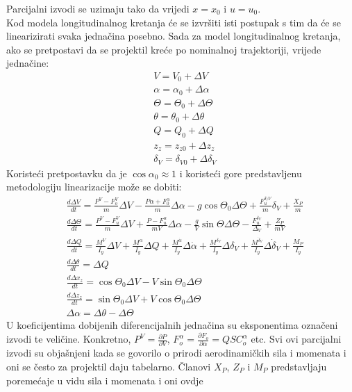 Parcijalni izvodi se uzimaju tako da vrijedi $x=x_0$ i $u=u_0$.\\
Kod modela longitudinalnog kretanja će se izvršiti isti postupak s tim da će se linearizirati svaka 
jednačina posebno. Sada za model longitudinalnog kretanja, ako se pretpostavi da se 
projektil kreće po nominalnoj trajektoriji, vrijede jednačine:
\begin{align}
    &V=V_0+\Delta V \\
    & \alpha = \alpha _0+\Delta \alpha\\
    & \Theta=\Theta _0 +\Delta \Theta\\
    & \theta= \theta _0+\Delta \theta\\
    & Q=Q_0+\Delta Q\\
    & z_z=z_{z0}+\Delta z_z\\
    & \delta _V=\delta _{V0}+\Delta \delta _V
\end{align}
Koristeći pretpostavku da je $\cos\alpha_0 \approx 1$ i koristeći gore predstavljenu metodologiju 
linearizacije može se dobiti:
\begin{align}
    &\frac{d\Delta V}{dt}=\frac{P^V-F_o^V}{m}\Delta V - \frac{P\alpha+F_0^\alpha}{m}\Delta\alpha - g\cos\Theta _0\Delta\Theta +\frac{F_u^{\delta )V}}{m}\delta_V+\frac{X_P}{m}\\
    &\frac{d\Delta \Theta}{dt}=\frac{P^V-F_u^V}{m}\Delta V + \frac{P-F_u^\alpha}{mV}\Delta \alpha-\frac{g}{V}\sin\Theta\Delta\Theta-\frac{F_u^{\delta_V}}{\Delta_V}+\frac{Z_P}{mV}\\
    &\frac{d\Delta Q}{dt}=\frac{M^V}{I_y}\Delta V+\frac{M^\alpha}{I_y}\Delta Q+\frac{M^{\dot{\alpha}}}{I_y}\Delta\dot{\alpha}+\frac{M^{\delta_V}}{I_y}\Delta \delta_V+\frac{M^{\dot{\delta}_V}}{I_y}\Delta \dot{\delta}_V+\frac{M_P}{I_y} \\
    &\frac{d\Delta \theta}{dt}=\Delta Q \\
    &\frac{d\Delta x_z}{dt}=\cos\Theta_0\Delta V-V\sin\Theta_0\Delta\Theta\\
    &\frac{d\Delta z_z}{dt}=\sin\Theta_0\Delta V+V\cos\Theta_0\Delta\Theta \\
    &\Delta\alpha=\Delta\theta - \Delta\Theta
\end{align}
U koeficijentima dobijenih diferencijalnih jednačina su eksponentima označeni izvodi te veličine. Konkretno, 
$P^V=\frac{\partial P}{\partial V}$, $F_o^\alpha = \frac{\partial F_o}{\partial \alpha} = QSC_o^\alpha$ etc. 
Svi ovi parcijalni izvodi su objašnjeni kada se govorilo o prirodi aerodinamičkih sila i momenata i oni se često 
za projektil daju tabelarno. Članovi $X_P$, $Z_P$ i $M_P$ predstavljaju poremećaje u vidu sila i momenata i oni ovdje 
